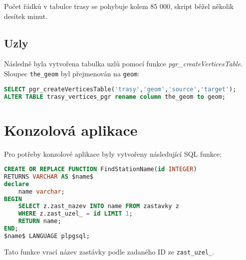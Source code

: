\documentclass[a4paper, 12pt]{article}
\begin{document}
Počet řádků v tabulce trasy se pohybuje kolem 85 000, skript běžel několik desítek minut. 

\newpage

\subsection{Uzly}
Následně byla vytvořena tabulka uzlů pomocí funkce \textit{pgr\_createVerticesTable}. Sloupec \texttt{the\_geom} byl přejmenován na \texttt{geom}:
\begin{lstlisting}[language=sql]
SELECT pgr_createVerticesTable('trasy','geom','source','target');
ALTER TABLE trasy_vertices_pgr rename column the_geom to geom;
\end{lstlisting} 

\section{Konzolová aplikace}
Pro potřeby konzolové aplikace byly vytvořeny následující SQL funkce: 
\begin{lstlisting}[language=sql]
CREATE OR REPLACE FUNCTION FindStationName(id INTEGER)
RETURNS VARCHAR AS $name$
declare 
	name varchar;
BEGIN 
	SELECT z.zast_nazev INTO name FROM zastavky z
	WHERE z.zast_uzel_ = id LIMIT 1; 
	RETURN name;
END;
$name$ LANGUAGE plpgsql;
\end{lstlisting} 
Tato funkce vrací název zastávky podle zadaného ID ze \texttt{zast\_uzel\_}.
\end{document}
